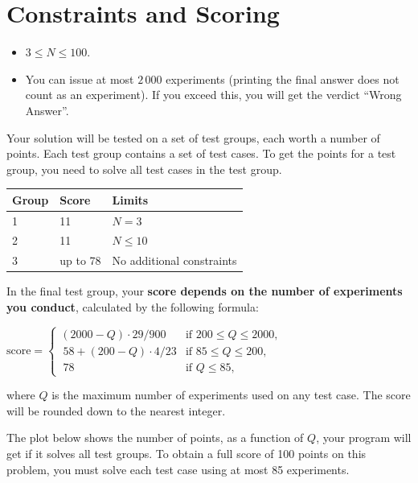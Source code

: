 \section*{Constraints and Scoring}
\begin{itemize}
\item $3 \le N \le 100$.
\item You can issue at most $2\,000$ experiments (printing the final answer does not count as an experiment). If you exceed this, you will get the verdict ``Wrong Answer''.
\end{itemize}


Your solution will be tested on a set of test groups, each worth a number of points.
Each test group contains a set of test cases. To get the points for a test group, you need to solve all test cases in the test group.

\begin{tabular}{|l|l|l|}
\hline
Group  &  Score  &  Limits \\
\hline
 1 & 11 & $N = 3$  \\
\hline
 2 & 11 & $N\le 10$ \\
\hline
 3 & up to 78 & No additional constraints \\
\hline
\end{tabular}


In the final test group, your \textbf{score depends on the number of experiments you conduct}, calculated by the following formula:

$\text{score} = \begin{cases}
  (2000-Q)\cdot 29/ 900& \text{if } 200 \le Q \le 2000, \\\
  58 + (200-Q)\cdot 4 / 23 & \text{if } 85 \le Q \le 200, \\\
  78 & \text{if } Q \le 85,
\end{cases}$

where $Q$ is the maximum number of experiments used on any test case.
The score will be rounded down to the nearest integer.

The plot below shows the number of points, as a function of $Q$, your program will get if it solves all test groups.
To obtain a full score of 100 points on this problem, you must solve each test case using at most 85 experiments.


